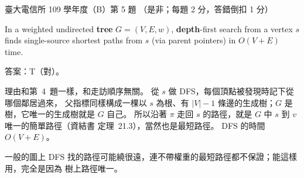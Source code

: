 \begin{pastexam}[label={px:ntu-109-comm-dsa-05}]{臺大電信所 109 學年度（B）第 5 題}
（是非；每題 2 分，答錯倒扣 1 分）

In a weighted undirected \textbf{tree} $G=(V,E,w)$, \textbf{depth}-first search from a vertex $s$
finds single-source shortest paths from $s$ (via parent pointers) in $O(V+E)$ time.
\end{pastexam}

\begin{pastsoln}
答案：T（對）。

理由和第~4~題一樣，和走訪順序無關。 從 $s$ 做 DFS，每個頂點被發現時記下從哪個鄰居過來，
父指標同樣構成一棵以 $s$ 為根、有 $|V| - 1$ 條邊的生成樹；$G$ 是樹，它唯一的生成樹就是 $G$
自己。 所以沿著 $\pi$ 走回 $s$ 的路徑，就是 $G$ 中 $s$ 到 $v$ 唯一的簡單路徑（資結書
定理~21.3），當然也是最短路徑。 DFS 的時間 $O(V + E)$。

一般的圖上 DFS 找的路徑可能繞很遠，連不帶權重的最短路徑都不保證；能這樣用，完全是因為
樹上路徑唯一。
\end{pastsoln}
